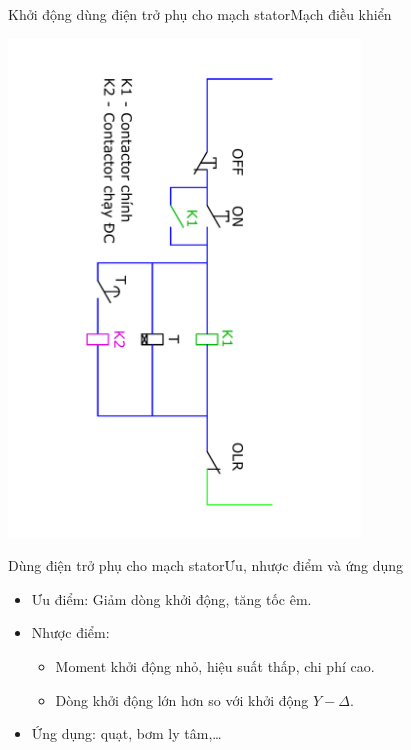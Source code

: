\documentclass[17pt]{beamer}
\begin{document}
\begin{frame}{Khởi động dùng điện trở phụ cho mạch stator}{Mạch điều khiển}
\vspace{-2cm}
\begin{center}
\includegraphics[width = 0.7\textwidth,angle=90]{../sodomach/sodomach-bc-chude1-41.pdf}
\end{center}
\end{frame}

\begin{frame}{Dùng điện trở phụ cho mạch stator}{Ưu, nhược điểm và ứng dụng}
\begin{itemize}
\item \alert{Ưu điểm}: Giảm dòng khởi động, tăng tốc êm.
\item \alert{Nhược điểm}: 
\begin{itemize}
\item Moment khởi động nhỏ, hiệu suất thấp, chi phí cao.
\item Dòng khởi động lớn hơn so với khởi động $Y - \Delta$.
\end{itemize}
\item \alert{Ứng dụng}: quạt, bơm ly tâm,\ldots
\end{itemize}
\end{frame}

\end{document}
